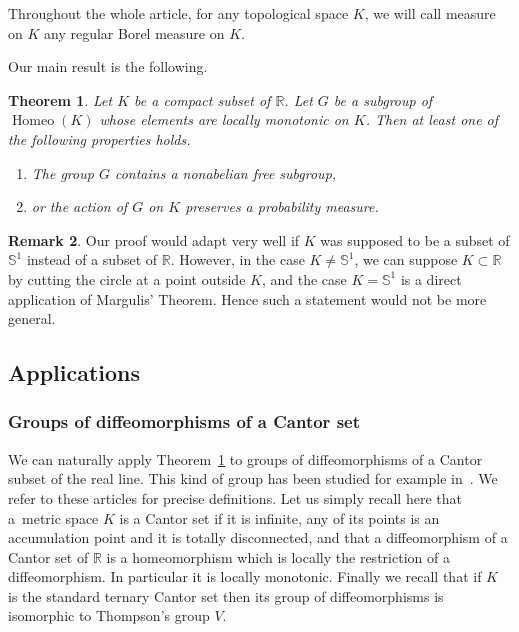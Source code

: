 \documentclass[10pt]{amsart}
\newtheorem{theo}{Theorem}[section]
\theoremstyle{definition}\newtheorem{defi}[theo]{Definition}\newtheorem{rema}[theo]{Remark}\newtheorem{exam}[theo]{Example}\newtheorem{exem}[theo]{Example}\newtheorem{nota}[theo]{Notation}
\DeclareMathOperator{\Homeo}{Homeo}
\newcommand{\bbS}{\mathbb{S}}
\newcommand{\R}{\mathbb{R}}
\newcounter{setofcase}
\newcounter{case}[setofcase]
\begin{document}
Throughout the whole article, for any topological space $K$, we will call measure on $K$ any regular Borel measure on $K$.

Our main result is the following.

\begin{theo}\label{Tits}
Let $K$ be a compact subset of $\R$. Let $G$ be a subgroup of $\Homeo(K)$ whose elements are locally monotonic on $K$. Then at least one of the following properties holds.
\begin{enumerate}
\item\label{theo1.3.1} The group $G$ contains a nonabelian free subgroup,
\item\label{theo1.3.2} or the action of $G$ on $K$ preserves a probability measure.
\end{enumerate}
\end{theo}


\begin{rema}
Our proof would adapt very well if $K$ was supposed to be a subset of $\bbS^1$ instead of a subset of $\R$. However, in the case $K\not=\bbS^1$, we can suppose $K \subset \R$ by cutting the circle at a point outside $K$, and the case $K=\bbS^1$ is a direct application of Margulis' Theorem. Hence such a statement would not be more general.
\end{rema}


\subsection{Applications}

\subsubsection*{Groups of diffeomorphisms of a Cantor set}

We can naturally apply Theorem~\ref{Tits} to groups of diffeomorphisms of a Cantor subset of the real line. This kind of group has been studied for example in~\cite{FN,MM}. We refer to these articles for precise definitions. Let us simply recall here that a~metric space $K$ is a Cantor set if it is infinite, any of its points is an accumulation point and it is totally disconnected, and that a diffeomorphism of a Cantor set of $\R$ is a homeomorphism which is locally the restriction of a diffeomorphism. In particular it is locally monotonic. Finally we recall that if $K$ is the standard ternary Cantor set then its group of diffeomorphisms is isomorphic to Thompson's group $V$.
\end{document}
